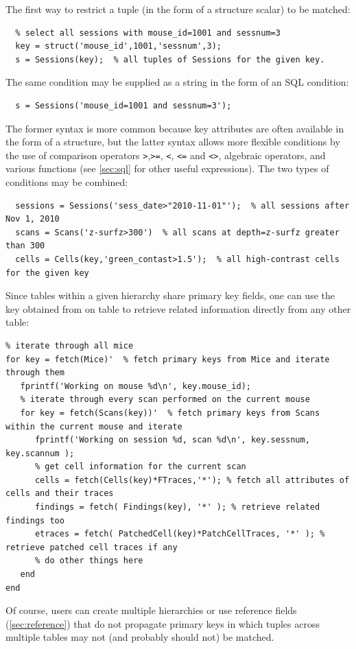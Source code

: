 \documentclass[10pt]{article}
\begin{document}
The first way to restrict a tuple (in the form of a structure scalar)  to be matched:
\begin{lstlisting}
  % select all sessions with mouse_id=1001 and sessnum=3
  key = struct('mouse_id',1001,'sessnum',3);    
  s = Sessions(key);  % all tuples of Sessions for the given key.
\end{lstlisting}

The same condition may be supplied as a string in the form of an SQL condition:
\begin{lstlisting}
  s = Sessions('mouse_id=1001 and sessnum=3');
\end{lstlisting}

The former syntax is more common because key attributes are often available in the form of a structure, but the latter syntax allows more flexible conditions by the use of comparison operators {\tt>},{\tt>=}, {\tt<}, {\tt<=} and {\tt <>}, algebraic operators, and various functions (see \autoref{sec:sql} for other useful expressions).  The two types of conditions may be combined:
\begin{lstlisting}
  sessions = Sessions('sess_date>"2010-11-01"');  % all sessions after Nov 1, 2010
  scans = Scans('z-surfz>300')  % all scans at depth=z-surfz greater than 300
  cells = Cells(key,'green_contast>1.5');  % all high-contrast cells for the given key 
\end{lstlisting}

Since tables within a given hierarchy share primary key fields, one can use the key obtained from on table to retrieve related information directly from any other table:
\begin{lstlisting}
% iterate through all mice
for key = fetch(Mice)'  % fetch primary keys from Mice and iterate through them
   fprintf('Working on mouse %d\n', key.mouse_id);
   % iterate through every scan performed on the current mouse
   for key = fetch(Scans(key))'  % fetch primary keys from Scans within the current mouse and iterate
      fprintf('Working on session %d, scan %d\n', key.sessnum, key.scannum );
      % get cell information for the current scan
      cells = fetch(Cells(key)*FTraces,'*'); % fetch all attributes of cells and their traces
      findings = fetch( Findings(key), '*' ); % retrieve related findings too
      etraces = fetch( PatchedCell(key)*PatchCellTraces, '*' ); % retrieve patched cell traces if any  
      % do other things here
   end
end
\end{lstlisting}
Of course, users can create multiple hierarchies or use reference fields (\autoref{sec:reference}) that do not propagate primary keys in which tuples across multiple tables may not (and probably should not) be matched.
\end{document}
